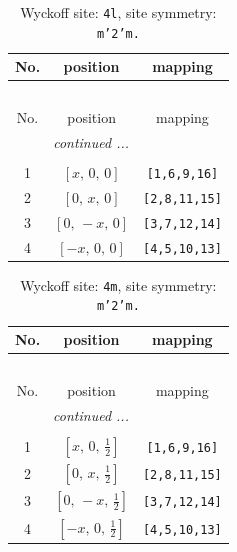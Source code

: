 \documentclass[fleqn,8pt]{jsarticle}
\begin{document}
\renewcommand{\arraystretch}{1.2}
\begin{longtable}{ccc}
\caption{Wyckoff site: {\tt 4l}, site symmetry: {\tt m'2'm.}}
 \\
 \hline \hline
No. & position & mapping \\ \hline \endfirsthead

\multicolumn{2}{l}{\tablename\ \thetable{}} \\
 \hline \hline
No. & position & mapping \\ \hline \endhead

 \hline \hline
\multicolumn{2}{r}{\footnotesize\it continued ...} \\ \endfoot

 \hline \hline
\multicolumn{2}{r}{} \\ \endlastfoot

1 & $\left[ x,\, 0,\, 0 \right]$ & {\tt [1,6,9,16]} \\ \hline
2 & $\left[ 0,\, x,\, 0 \right]$ & {\tt [2,8,11,15]} \\ \hline
3 & $\left[ 0,\, - x,\, 0 \right]$ & {\tt [3,7,12,14]} \\ \hline
4 & $\left[ - x,\, 0,\, 0 \right]$ & {\tt [4,5,10,13]} \\
\end{longtable}
\renewcommand{\arraystretch}{1.2}
\begin{longtable}{ccc}
\caption{Wyckoff site: {\tt 4m}, site symmetry: {\tt m'2'm.}}
 \\
 \hline \hline
No. & position & mapping \\ \hline \endfirsthead

\multicolumn{2}{l}{\tablename\ \thetable{}} \\
 \hline \hline
No. & position & mapping \\ \hline \endhead

 \hline \hline
\multicolumn{2}{r}{\footnotesize\it continued ...} \\ \endfoot

 \hline \hline
\multicolumn{2}{r}{} \\ \endlastfoot

1 & $\left[ x,\, 0,\, \frac{1}{2} \right]$ & {\tt [1,6,9,16]} \\ \hline
2 & $\left[ 0,\, x,\, \frac{1}{2} \right]$ & {\tt [2,8,11,15]} \\ \hline
3 & $\left[ 0,\, - x,\, \frac{1}{2} \right]$ & {\tt [3,7,12,14]} \\ \hline
4 & $\left[ - x,\, 0,\, \frac{1}{2} \right]$ & {\tt [4,5,10,13]} \\
\end{longtable}
\end{document}
